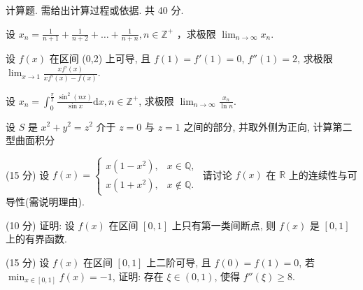 \par{}
计算题. 需给出计算过程或依据. 共 40 分.\par
设 $x_{n} = \frac{1}{n + 1} +\frac{1}{n + 2} +\dots +\frac{1}{n + n}, n\in \mathbb{Z}^{+}$ ，求极限 $\lim_{n\to \infty}x_n.$\par
设 $f(x)$ 在区间 (0,2) 上可导, 且 $f(1) = f'(1) = 0$, $f''(1) = 2$, 求极限 $\lim_{x \to 1} \frac{xf'(x)}{xf'(x) - f(x)}$.\par
设 $x_{n} = \int_{0}^{\frac{\pi}{2}}\frac{\sin^{2}(nx)}{\sin x}\mathrm{d}x, n\in \mathbb{Z}^{+}$, 求极限 $\lim_{n\to \infty}\frac{x_n}{\ln n}$.\par
\par{}
设 $S$ 是 $x^{2} + y^{2} = z^{2}$ 介于 $z = 0$ 与 $z = 1$ 之间的部分, 并取外侧为正向, 计算第二型曲面积分\par
\nopagebreak[4]
\par{}
(15 分) 设 $f(x) = \begin{cases} x(1 - x^2), & x \in \mathbb{Q}, \\ x(1 + x^2), & x \notin \mathbb{Q}. \end{cases}$ 请讨论 $f(x)$ 在 $\mathbb{R}$ 上的连续性与可导性(需说明理由).\par
\par{}
(10 分) 证明: 设 $f(x)$ 在区间 $[0,1]$ 上只有第一类间断点, 则 $f(x)$ 是 $[0,1]$ 上的有界函数.\par
\par{}
(15 分) 设 $f(x)$ 在区间 $[0,1]$ 上二阶可导, 且 $f(0) = f(1) = 0$, 若 $\min_{x \in [0,1]} f(x) = -1$, 证明: 存在 $\xi \in (0,1)$, 使得 $f''(\xi) \geq 8$.\par
